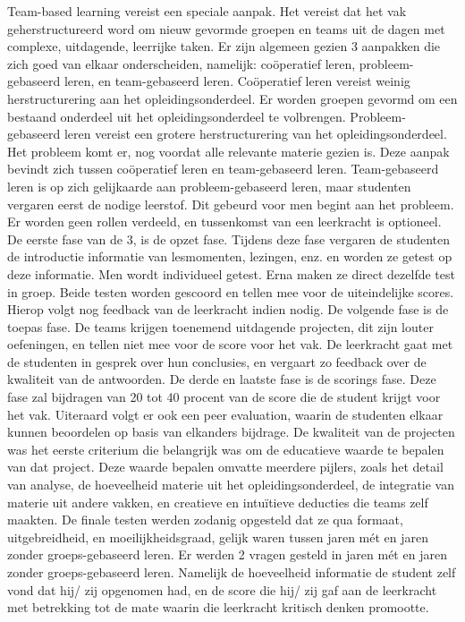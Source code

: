 \documentclass{hogent-article}
\begin{document}
	Team-based learning vereist een speciale aanpak. Het vereist dat het vak geherstructureerd word om nieuw gevormde groepen en teams uit de dagen met complexe, uitdagende, leerrijke taken. Er zijn algemeen gezien 3 aanpakken die zich goed van elkaar onderscheiden, namelijk: coöperatief leren, probleem-gebaseerd leren, en team-gebaseerd leren.
	Coöperatief leren vereist weinig herstructurering aan het opleidingsonderdeel. Er worden groepen gevormd om een bestaand onderdeel uit het opleidingsonderdeel te volbrengen.
	Probleem-gebaseerd leren vereist een grotere herstructurering van het opleidingsonderdeel. Het probleem komt er, nog voordat alle relevante materie gezien is. Deze aanpak bevindt zich tussen coöperatief leren en team-gebaseerd leren.
	Team-gebaseerd leren is op zich gelijkaarde aan probleem-gebaseerd leren, maar studenten vergaren eerst de nodige leerstof. Dit gebeurd voor men begint aan het probleem. Er worden geen rollen verdeeld, en tussenkomst van een leerkracht is optioneel.
	De eerste fase van de 3, is de opzet fase. Tijdens deze fase vergaren de studenten de introductie informatie van lesmomenten, lezingen, enz. en worden ze getest op deze informatie. Men wordt individueel getest. Erna maken ze direct dezelfde test in groep. Beide testen worden gescoord en tellen mee voor de uiteindelijke scores. Hierop volgt nog feedback van de leerkracht indien nodig.
	De volgende fase is de toepas fase. De teams krijgen toenemend uitdagende projecten, dit zijn louter oefeningen, en tellen niet mee voor de score voor het vak. De leerkracht gaat met de studenten in gesprek over hun conclusies, en vergaart zo feedback over de kwaliteit van de antwoorden. 
	De derde en laatste fase is de scorings fase. Deze fase zal bijdragen van 20 tot 40 procent van de score die de student krijgt voor het vak. Uiteraard volgt er ook een peer evaluation, waarin de studenten elkaar kunnen beoordelen op basis van elkanders bijdrage.
	De kwaliteit van de projecten was het eerste criterium die belangrijk was om de educatieve waarde te bepalen van dat project. Deze waarde bepalen omvatte meerdere pijlers, zoals het detail van analyse, de hoeveelheid materie uit het opleidingsonderdeel, de integratie van materie uit andere vakken, en creatieve en intuïtieve deducties die teams zelf maakten.
	De finale testen werden zodanig opgesteld dat ze qua formaat, uitgebreidheid, en moeilijkheidsgraad, gelijk waren tussen jaren mét en jaren zonder groeps-gebaseerd leren.
	Er werden 2 vragen gesteld in jaren mét en jaren zonder groeps-gebaseerd leren. Namelijk de hoeveelheid informatie de student zelf vond dat hij/ zij opgenomen had, en de score die hij/ zij gaf aan de leerkracht met betrekking tot de mate waarin die leerkracht kritisch denken promootte.
\end{document}
